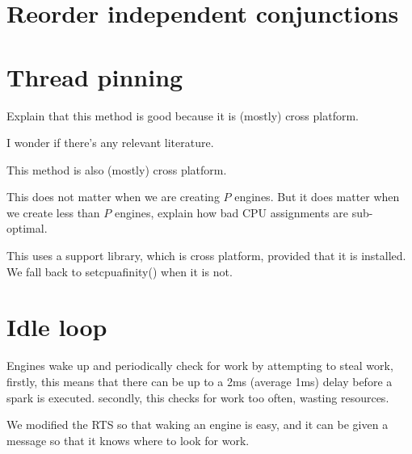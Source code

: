 


\section{Reorder independent conjunctions}

\section{Thread pinning}
\label{sec:thread_pinning}


Explain that this method is good because it is (mostly) cross platform.

I wonder if there's any relevant literature.

This method is also (mostly) cross platform.

This does not matter when we are creating $P$ engines.
But it does matter when we create less than $P$ engines,
explain how bad CPU assignments are sub-optimal.

This uses a support library, which is cross platform, provided that it is installed.
We fall back to setcpuafinity() when it is not.


\section{Idle loop}
\label{sec:idle_loop}

Engines wake up and periodically check for work by attempting to
steal work,
firstly, this means that there can be up to a 2ms (average 1ms) delay before
a spark is executed.
secondly, this checks for work too often, wasting resources.

We modified the RTS so that waking an engine is easy, and it can be given a
message so that it knows where to look for work.

